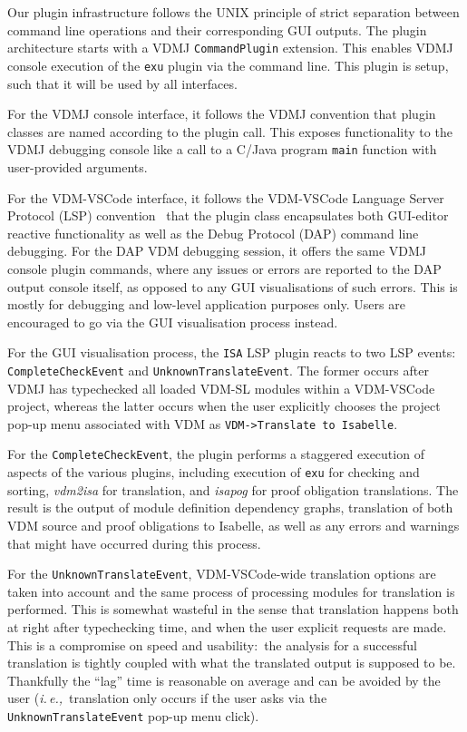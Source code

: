 \documentclass[runningheads,a4paper]{llncs}
\newcommand{\ie}{{\em i.\,e.,\/}}
\begin{document}
Our plugin infrastructure follows the UNIX principle of strict separation between command line operations and their corresponding GUI outputs. The plugin architecture starts with a VDMJ \texttt{CommandPlugin} extension. This enables VDMJ console execution of the \texttt{exu} plugin via the command line. This plugin is setup, such that it will be used by all interfaces. 

For the VDMJ console interface, it follows the VDMJ convention that plugin classes are named according to the plugin call. This exposes functionality to the VDMJ debugging console like a call to a C/Java program \texttt{main} function with user-provided arguments.   

For the VDM-VSCode interface, it follows the VDM-VSCode Language Server Protocol (LSP) convention~\cite{AdvancedVSCodePaper} that the plugin class encapsulates both GUI-editor reactive functionality as well as the Debug Protocol (DAP) command line debugging. For the DAP VDM debugging session, it offers the same VDMJ console plugin commands, where any issues or errors are reported to the DAP output console itself, as opposed to any GUI visualisations of such errors. This is mostly for debugging and low-level application purposes only. Users are encouraged to go via the GUI visualisation process instead. 

For the GUI visualisation process, the \texttt{ISA} LSP plugin reacts to two LSP events: \texttt{CompleteCheckEvent} and \texttt{UnknownTranslateEvent}. The former occurs after VDMJ has typechecked all loaded VDM-SL modules within a VDM-VSCode project, whereas the latter occurs when the user explicitly chooses the project pop-up menu associated with VDM as {\verb'VDM->Translate to Isabelle'}. 

For the \texttt{CompleteCheckEvent}, the plugin performs a staggered execution of aspects of the various plugins, including execution of \texttt{exu} for checking and sorting, \textit{vdm2isa} for translation, and \textit{isapog} for proof obligation translations. The result is the output of module definition dependency graphs, translation of both VDM source and proof obligations to Isabelle, as well as any errors and warnings that might have occurred during this process. 

For the \texttt{UnknownTranslateEvent}, VDM-VSCode-wide translation options are taken into account and the same process of processing modules for translation is performed. This is somewhat wasteful in the sense that translation happens both at right after typechecking time, and when the user explicit requests are made. This is a compromise on speed and usability:~the analysis for a successful translation is tightly coupled with what the translated output is supposed to be. Thankfully the ``lag'' time is reasonable on average and can be avoided by the user (\ie~translation only occurs if the user asks via the \texttt{UnknownTranslateEvent} pop-up menu click). 
\end{document}
